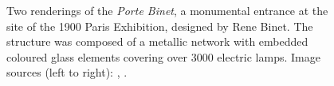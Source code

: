 \documentclass{article}
\begin{document}
\begin{figure}[ht!]
    \centering
    \caption{Two renderings of the \textit{Porte Binet}, a monumental entrance at the site of the 1900 Paris Exhibition, designed by Rene Binet. The structure was composed of a metallic network with embedded coloured glass elements covering over 3000 electric lamps. \newline Image sources (left to right): \cite{louis_porte_1900}, \cite{binet_projet_1898}.}
    \label{fig:porte_binet}
\end{figure}

\clearpage
\end{document}
